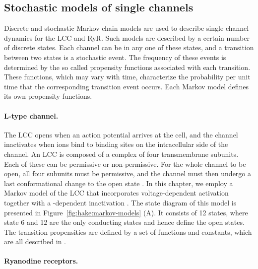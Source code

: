 \subsection{Stochastic models of single channels}
\label{sec:hake:stochastic-models}

Discrete and stochastic Markov chain models are used to describe
single channel dynamics for the LCC and RyR. Such models are described
by a certain number of discrete states. Each channel can be in any one
of these states, and a transition between two states is a stochastic
event. The frequency of these events is determined by the so called
propensity functions associated with each transition. These functions,
which may vary with time, characterize the probability per unit time
that the corresponding transition event occurs. Each Markov model
defines its own propensity functions.

\paragraph{L-type \Ca channel.}
\label{sec:hake:lcc}


The LCC opens when an action potential
arrives at the cell, and the channel inactivates when \Ca ions bind to
binding sites on the intracellular side of the channel. An LCC is
composed of a complex of four transmembrane subunits. Each of these
can be permissive or non-permissive. For the whole channel to be open,
all four subunits must be permissive, and the channel must then
undergo a last conformational change to the open state
\citep{Hille2001}. In this chapter, we employ a Markov model of the LCC
that incorporates voltage-dependent activation together with a
\Ca-dependent inactivation
\citep{JafriRiceWinslow1998,GreensteinWinslow2002}. The state diagram
of this model is presented in Figure~\ref{fig:hake:markov-models}
(A). It consists of 12 states, where state 6 and 12 are the
only conducting states and hence define the open states. The
transition propensities are defined by a set of functions and
constants, which are all described in \citet{GreensteinWinslow2002}.

\vspace*{-6pt}\paragraph{Ryanodine receptors.}
\label{sec:hake:ryr}

